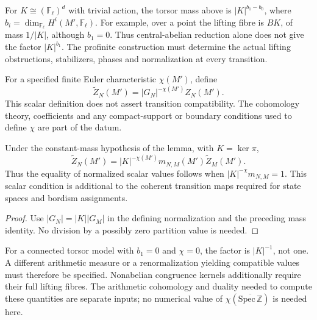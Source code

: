 \begin{remark}
\label{v4-arith:w10-a:rem:divergence-factor}
For $K\cong(\mathbb F_\ell)^d$ with trivial action, the torsor
mass above is $|K|^{b_1-b_0}$, where
$b_i=\dim_{\mathbb F_\ell}H^i(M',\mathbb F_\ell)$.
For example, over a point the lifting fibre is $BK$, of mass
$1/|K|$, although $b_1=0$. Thus central-abelian reduction alone
does not give the factor $|K|^{b_1}$.
The profinite construction must determine the actual lifting
obstructions, stabilizers, phases and normalization at every transition.
\end{remark}

\begin{definition}
\label{v4-arith:w10-a:def:renorm-tower}
For a specified finite Euler characteristic $\chi(M')$, define
\begin{equation}
\label{v4-arith:w10-a:eq:renorm-tower}
 \widetilde Z_N(M')=|G_N|^{-\chi(M')}Z_N(M').
\end{equation}
This scalar definition does not assert transition compatibility.
The cohomology theory, coefficients and any compact-support or
boundary conditions used to define $\chi$ are part of the datum.
\end{definition}

\begin{proposition}
\label{v4-arith:w10-a:prop:renorm-compat}
Under the constant-mass hypothesis of the lemma, with $K=\ker\pi$,
\begin{equation}
\label{v4-arith:w10-a:eq:renorm-compat}
 \widetilde Z_N(M')=|K|^{-\chi(M')}m_{N,M}(M')\widetilde Z_M(M').
\end{equation}
Thus the equality of normalized scalar values follows when
$|K|^{-\chi}m_{N,M}=1$.
This scalar condition is additional to the coherent transition maps
required for state spaces and bordism assignments.
\end{proposition}
\begin{proof}
Use $|G_N|=|K||G_M|$ in the defining normalization and the preceding
mass identity. No division by a possibly zero partition value is needed.
\end{proof}
For a connected torsor model with $b_1=0$ and $\chi=0$, the factor
is $|K|^{-1}$, not one. A different arithmetic measure or a
renormalization yielding compatible values must therefore be specified.
Nonabelian congruence kernels additionally require their full lifting
fibres. The arithmetic cohomology and duality needed to compute
these quantities are separate inputs; no numerical value of
$\chi(\overline{\mathrm{Spec}\,\mathbb Z})$ is needed here.

